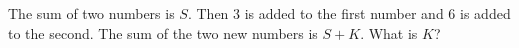 The sum of two numbers is $S$. Then $3$ is added to the first number and $6$ is added to the second. The sum of the two new numbers is $S+K$. What is $K$?
